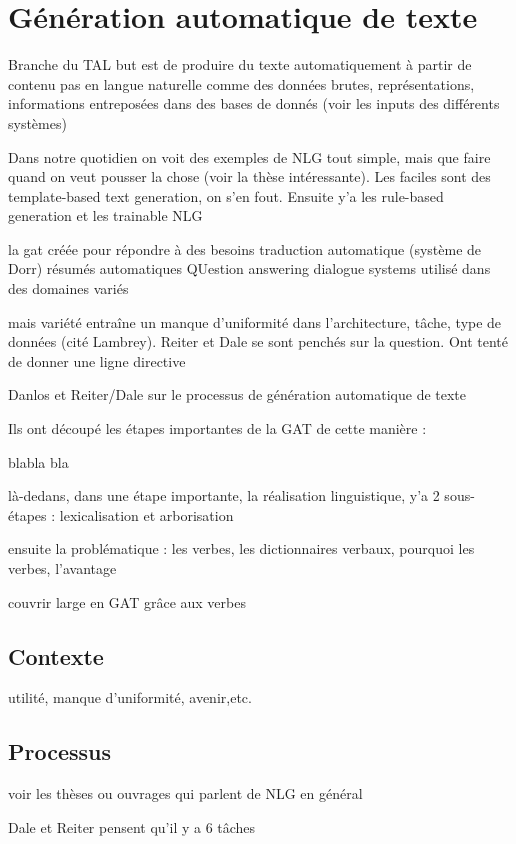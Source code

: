 \chapter{Génération automatique de texte}

Branche du TAL
but est de produire du texte automatiquement à partir de contenu pas en langue naturelle comme des données brutes, représentations, informations entreposées dans des bases de donnés (voir les inputs des différents systèmes)

Dans notre quotidien on voit des exemples de NLG tout simple, mais que faire quand on veut pousser la chose (voir la thèse intéressante). Les faciles sont des template-based text generation, on s'en fout. Ensuite y'a les rule-based generation et les trainable NLG

la gat créée pour répondre à des besoins
traduction automatique (système de Dorr)
résumés automatiques
QUestion answering
dialogue systems
utilisé dans des domaines variés

mais variété entraîne un manque d'uniformité dans l'architecture, tâche, type de données (cité Lambrey).
Reiter et Dale se sont penchés sur la question. Ont tenté de donner une ligne directive

Danlos et Reiter/Dale sur le processus de génération automatique de texte

Ils ont découpé les étapes importantes de la GAT de cette manière :

blabla bla

là-dedans, dans une étape importante, la réalisation linguistique, y'a 2 sous-étapes : lexicalisation et arborisation

ensuite la problématique : les verbes, les dictionnaires verbaux, pourquoi les verbes, l'avantage

couvrir large en GAT grâce aux verbes

\section{Contexte}

utilité, manque d'uniformité, avenir,etc.

\section{Processus}

voir les thèses ou ouvrages qui parlent de NLG en général

Dale et Reiter pensent qu'il y a 6 tâches

